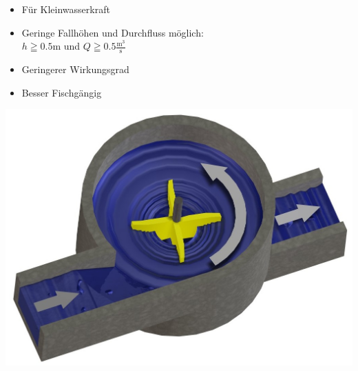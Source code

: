 \begin{minipage}[c]{0.58\columnwidth}
    \begin{itemize}
    \item Für Kleinwasserkraft
    \item Geringe Fallhöhen und Durchfluss möglich:\\
    $h \geqq 0.5\text{m}$ und $Q \geqq 0.5 \frac{\text{m}^3}{\text{s}}$
    \item Geringerer Wirkungsgrad
    \item Besser Fischgängig
\end{itemize}
\end{minipage}
\hfill
\begin{minipage}[c]{0.38\columnwidth}
    \includegraphics[width=0.65\columnwidth, align=c]{images/Wasserwirbelkraftwerk.jpg}
\end{minipage}
